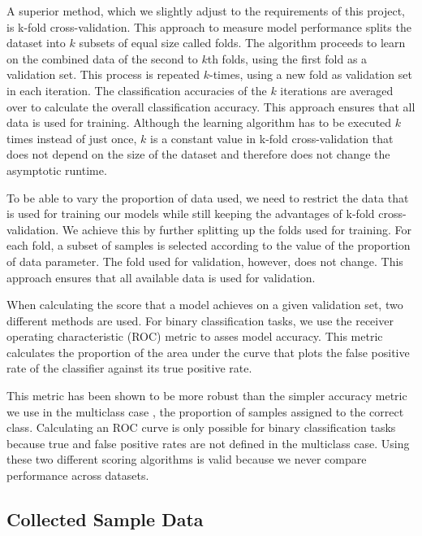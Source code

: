 \documentclass[a4paper,12pt,twoside,openright]{report}
\begin{document}
A superior method, which we slightly adjust to the requirements of this project, is k-fold cross-validation. This approach to measure model performance splits the dataset into $k$ subsets of equal size called folds. The algorithm proceeds to learn on the combined data of the second to $k$th folds, using the first fold as a validation set. This process is repeated $k$-times, using a new fold as validation set in each iteration. The classification accuracies of the $k$ iterations are  averaged over to calculate the overall classification accuracy. This approach ensures that all data is used for training. Although the learning algorithm has to be executed $k$ times instead of just once, $k$ is a constant value in k-fold cross-validation that does not depend on the size of the dataset and therefore does not change the asymptotic runtime.

To be able to vary the proportion of data used, we need to restrict the data that is used for training our models while still keeping the advantages of k-fold cross-validation. We achieve this by further splitting up the folds used for training. For each fold, a subset of samples is selected according to the value of the proportion of data parameter. The fold used for validation, however, does not change. This approach ensures that all available data is used for validation.

When calculating the score that a model achieves on a given validation set, two different methods are used. For binary classification tasks, we use the receiver operating characteristic (ROC) metric to asses model accuracy. This metric calculates the proportion of the area under the curve that plots the false positive rate of the classifier against its true positive rate. 

This metric has been shown to be more robust than the simpler accuracy metric we use in the multiclass case \cite{Bradley97theuse}, the proportion of samples assigned to the correct class. Calculating an ROC curve is only possible for binary classification tasks because true and false positive rates are not defined in the multiclass case. Using these two different scoring algorithms is valid because we never compare performance across datasets.





\subsection{Collected Sample Data}
\end{document}
